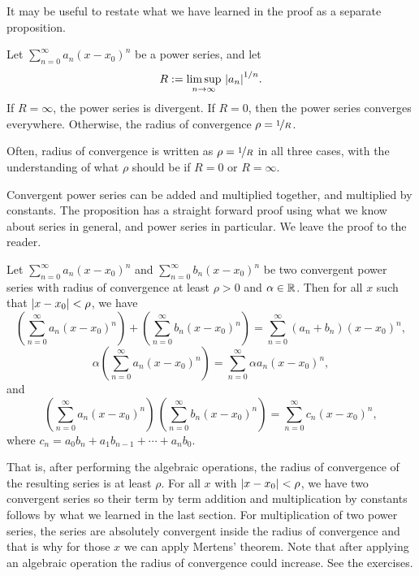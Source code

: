 It may be useful to restate what we have learned in the proof
as a separate proposition.

\begin{prop}
Let $\sum_{n=0}^\infty a_n {(x-x_0)}^n$ be a power series, and let
\begin{equation*}
R := \limsup_{n\to\infty} \, {\left\lvert {a_n} \right\rvert}^{1/n} .
\end{equation*}
If $R = \infty$, the power series is divergent.  If
$R=0$, then the power series converges everywhere.   Otherwise,
the radius of convergence $\rho = \nicefrac{1}{R}$.
\end{prop}

Often, radius of convergence is written as $\rho = \nicefrac{1}{R}$ in all
three cases, with
the understanding of what $\rho$ should be if $R = 0$ or $R =
\infty$.

Convergent power series can be added and multiplied together, and multiplied
by constants.
The proposition has a straight forward proof using what we know about series
in general, and power series in particular.  We leave the proof to the reader.

\begin{prop}
Let $\sum_{n=0}^\infty a_n {(x-x_0)}^n$ and
$\sum_{n=0}^\infty b_n {(x-x_0)}^n$ be two convergent power series
with radius of convergence at least $\rho > 0$ and $\alpha \in {\mathbb{R}}$.  Then
for all $x$ such that $\left\lvert {x-x_0} \right\rvert < \rho$, we have 
\begin{equation*}
\left(\sum_{n=0}^\infty a_n {(x-x_0)}^n\right)
+
\left(\sum_{n=0}^\infty b_n {(x-x_0)}^n\right)
=
\sum_{n=0}^\infty (a_n+b_n) {(x-x_0)}^n ,
\end{equation*}
\begin{equation*}
\alpha
\left(\sum_{n=0}^\infty a_n {(x-x_0)}^n\right)
=
\sum_{n=0}^\infty \alpha a_n {(x-x_0)}^n ,
\end{equation*}
and
\begin{equation*}
\left(\sum_{n=0}^\infty a_n {(x-x_0)}^n\right)
\,
\left(\sum_{n=0}^\infty b_n {(x-x_0)}^n\right)
=
\sum_{n=0}^\infty c_n {(x-x_0)}^n ,
\end{equation*}
where
$c_n = a_0b_n + a_1 b_{n-1} + \cdots + a_n b_0$.
\end{prop}

That is, after performing the algebraic operations, the
radius of convergence of the resulting series is at least $\rho$.
For all $x$ with $\left\lvert {x-x_0} \right\rvert < \rho$, we have two convergent series so
their term by term addition and multiplication by constants
follows by what we learned in the last section.
For multiplication of two power series,
the series are absolutely convergent inside
the radius of convergence and that is why for those $x$
we can apply Mertens' theorem.
Note that after applying an algebraic operation the radius of convergence
could increase.  See the exercises.

